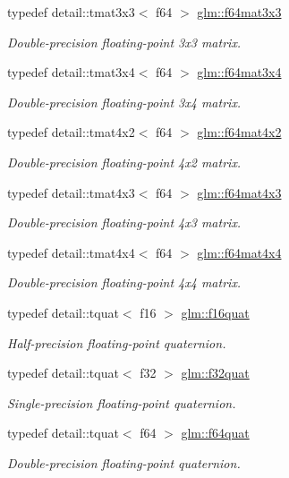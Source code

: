\begin{DoxyCompactItemize}
typedef detail\-::tmat3x3$<$ f64 $>$ \hyperlink{group__gtc__type__precision_gac0fe6a1fb044122b28859feede132b75}{glm\-::f64mat3x3}
\begin{DoxyCompactList}\small\item\em Double-\/precision floating-\/point 3x3 matrix. \end{DoxyCompactList}\item 
typedef detail\-::tmat3x4$<$ f64 $>$ \hyperlink{group__gtc__type__precision_ga41bb7ff3c269ffae270d33acb3fcfae3}{glm\-::f64mat3x4}
\begin{DoxyCompactList}\small\item\em Double-\/precision floating-\/point 3x4 matrix. \end{DoxyCompactList}\item 
typedef detail\-::tmat4x2$<$ f64 $>$ \hyperlink{group__gtc__type__precision_ga1097a920f29777c4220939e323377012}{glm\-::f64mat4x2}
\begin{DoxyCompactList}\small\item\em Double-\/precision floating-\/point 4x2 matrix. \end{DoxyCompactList}\item 
typedef detail\-::tmat4x3$<$ f64 $>$ \hyperlink{group__gtc__type__precision_gaa24e152ef6e17be752c350e495c879de}{glm\-::f64mat4x3}
\begin{DoxyCompactList}\small\item\em Double-\/precision floating-\/point 4x3 matrix. \end{DoxyCompactList}\item 
typedef detail\-::tmat4x4$<$ f64 $>$ \hyperlink{group__gtc__type__precision_ga8f54fb7f48ddf13b3dea075ae89baa78}{glm\-::f64mat4x4}
\begin{DoxyCompactList}\small\item\em Double-\/precision floating-\/point 4x4 matrix. \end{DoxyCompactList}\item 
typedef detail\-::tquat$<$ f16 $>$ \hyperlink{group__gtc__type__precision_gaf88b8ffe0545265127f072a73725337f}{glm\-::f16quat}
\begin{DoxyCompactList}\small\item\em Half-\/precision floating-\/point quaternion. \end{DoxyCompactList}\item 
typedef detail\-::tquat$<$ f32 $>$ \hyperlink{group__gtc__type__precision_ga7edc623b0da433e074936e732600766f}{glm\-::f32quat}
\begin{DoxyCompactList}\small\item\em Single-\/precision floating-\/point quaternion. \end{DoxyCompactList}\item 
typedef detail\-::tquat$<$ f64 $>$ \hyperlink{group__gtc__type__precision_ga61f850d473c8569fcc124bdeed386f57}{glm\-::f64quat}
\begin{DoxyCompactList}\small\item\em Double-\/precision floating-\/point quaternion. \end{DoxyCompactList}\end{DoxyCompactItemize}



